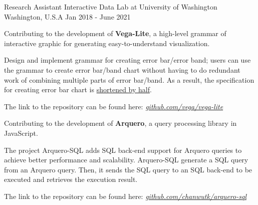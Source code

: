 \begin{cventries}
  \cventry
    {Research Assistant} %
    {Interactive Data Lab at University of Washington} %
    {Washington, U.S.A} %
    {Jan 2018 - June 2021} %
    {
      \begin{cvitems} %
        \item {
          Contributing to the development of \textbf{Vega-Lite}, a high-level grammar of interactive graphic for generating easy-to-understand visualization.
        }
        \item {
          Design and implement grammar for creating error bar/error band;
          users can use the grammar to create error bar/band chart without having to do redundant work of combining multiple parts of error bar/band.
          As a result, the specification for creating error bar chart is \underline{shortened by half}.
        }
        \item {
          The link to the repository can be found here: 
          \href{https://www.github.com/vega/vega-lite}{\textit{github.com/vega/vega-lite}}
        }
        \hfill \break
        \item {
          Contributing to the development of \textbf{Arquero}, a query processing library in JavaScript.
        }
        \item {
          The project Arquero-SQL adds SQL back-end support for Arquero queries to achieve better performance and scalability. Arquero-SQL generate a SQL query from an Arquero query.
          Then, it sends the SQL query to an SQL back-end to be executed and retrieves the execution result.
        }
        \item {
          The link to the repository can be found here: 
          \href{https://www.github.com/chanwutk/arquero-sql}{\textit{github.com/chanwutk/arquero-sql}}
        }
      \end{cvitems}
    }


\end{cventries}
